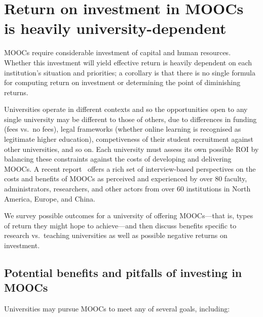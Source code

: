 \section{Return on investment in MOOCs is heavily university-dependent}
\label{sec:roi}


MOOCs require considerable investment of capital and human resources.
Whether this investment will yield effective return is heavily dependent
on each institution's situation and priorities; a corollary is that
there is no single formula for computing return on investment or
determining the point of diminishing returns.

Universities operate in different contexts and so the opportunities open
to any single university may be different to those of others, due to
differences in funding (fees vs.\ no fees), legal frameworks (whether online
learning is recognised as legitimate higher education), competiveness of their
student recruitment against other universities, and so on.  Each
university must assess its own possible ROI by balancing these constraints
against the costs of developing and delivering MOOCs.
A recent report~\cite{moocs-expectations-and-reality} offers a rich set of
interview-based perspectives on the costs and benefits of MOOCs as
perceived and experienced by over 80 faculty, administrators,
researchers, and other actors from over 60 institutions in North
America, Europe, and China.

We survey possible outcomes for a university of offering MOOCs---that
is, types of return they might hope to achieve---and then discuss
benefits specific to research vs.\ teaching universities as well as
possible negative returns on investment.

\subsection{Potential benefits and pitfalls of investing in MOOCs}
 
Universities may pursue MOOCs to meet any of several goals, including:

